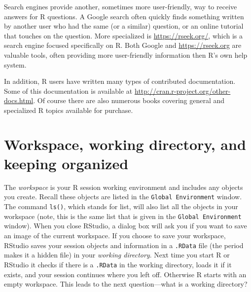 \documentclass[]{krantz}
\theoremstyle{definition}
\theoremstyle{definition}
\theoremstyle{definition}
\theoremstyle{remark}
\begin{document}
Search engines provide another, sometimes more user-friendly, way to
receive answers for R questions. A Google search often quickly finds
something written by another user who had the same (or a similar)
question, or an online tutorial that touches on the question. More
specialized is \url{https://rseek.org/}, which is a search engine
focused specifically on R. Both Google and \url{https://rseek.org} are
valuable tools, often providing more user-friendly information then R's
own help system.

In addition, R users have written many types of contributed
documentation. Some of this documentation is available at
\url{http://cran.r-project.org/other-docs.html}. Of course there are
also numerous books covering general and specialized R topics available
for purchase.

\section{Workspace, working directory, and keeping
organized}\label{workspace-working-directory-and-keeping-organized}

The \emph{workspace} is your R session working environment and includes
any objects you create. Recall these objects are listed in the
\texttt{Global\ Environment} window. The command \texttt{ls()}, which
stands for list, will also list all the objects in your workspace (note,
this is the same list that is given in the \texttt{Global\ Environment}
window). When you close RStudio, a dialog box will ask you if you want
to save an image of the current workspace. If you choose to save your
workspace, RStudio saves your session objects and information in a
\texttt{.RData} file (the period makes it a hidden file) in your
\emph{working directory}. Next time you start R or RStudio it checks if
there is a \texttt{.RData} in the working directory, loads it if it
exists, and your session continues where you left off. Otherwise R
starts with an empty workspace. This leads to the next question---what
is a working directory?
\end{document}
